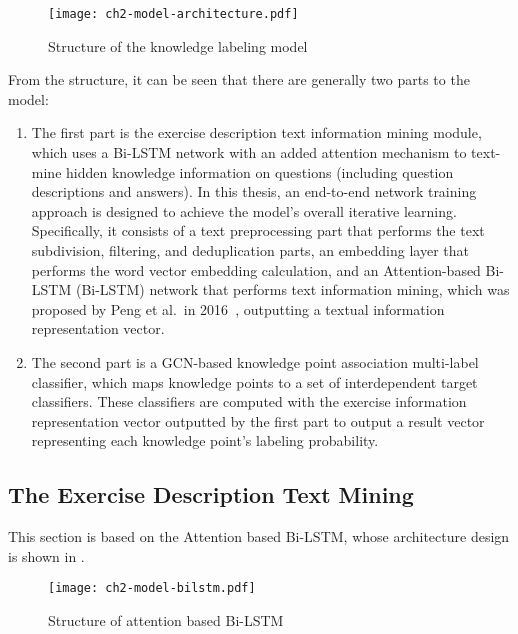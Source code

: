 \begin{figure}[htb]
    \centering
    \texttt{[image: ch2-model-architecture.pdf]}
    \caption{Structure of the knowledge labeling model}\label{fig:ch2-modelarchitecture}
\end{figure}




From the structure, it can be seen that there are generally two parts to the model:
\begin{enumerate}
    \item The first part is the exercise description text information mining module, which uses a Bi-LSTM network with an added attention mechanism to text-mine hidden knowledge information on questions (including question descriptions and answers). In this thesis, an end-to-end network training approach is designed to achieve the model's overall iterative learning. Specifically, it consists of a text preprocessing part that performs the text subdivision, filtering, and deduplication parts, an embedding layer that performs the word vector embedding calculation, and an Attention-based Bi-LSTM (Bi-LSTM) network that performs text information mining, which was proposed by Peng et al.\ in 2016~\cite{zhou2016attention}, outputting a textual information representation vector.
    \item The second part is a GCN-based knowledge point association multi-label classifier, which maps knowledge points to a set of interdependent target classifiers. These classifiers are computed with the exercise information representation vector outputted by the first part to output a result vector representing each knowledge point's labeling probability.
\end{enumerate}


\subsection{The Exercise Description Text Mining}
This section is based on the Attention based Bi-LSTM, whose architecture design is shown in \figname{\ref{fig:ch2-model-bilstm}}.
\begin{figure}[htbp!]
    \centering
    \texttt{[image: ch2-model-bilstm.pdf]}
    \caption{Structure of attention based Bi-LSTM}\label{fig:ch2-model-bilstm}
\end{figure}


